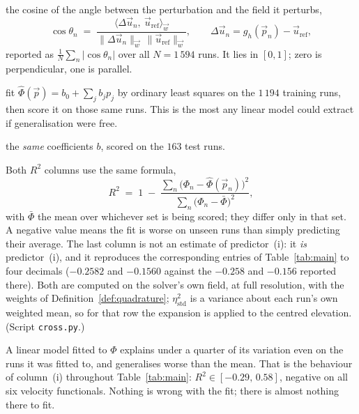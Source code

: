 \documentclass[11pt,a4paper]{article}
\theoremstyle{plain}
\theoremstyle{definition}
\theoremstyle{remark}
\begin{document}
\begin{description}\itemsep3pt
\item[mean $|\cos\theta|$] the cosine of the angle between the perturbation and
the field it perturbs,
\begin{equation}
\label{eq:costheta}
\cos\theta_n \;=\;
\frac{\bigl\langle \Delta\vec{u}_n,\ \vec{u}_{\mathrm{ref}}\bigr\rangle_{\vec w}}
     {\|\Delta\vec{u}_n\|_{\vec w}\ \|\vec{u}_{\mathrm{ref}}\|_{\vec w}},
\qquad
\Delta\vec{u}_n = g_h(\vec p_n) - \vec{u}_{\mathrm{ref}},
\end{equation}
reported as $\tfrac{1}{N}\sum_n |\cos\theta_n|$ over all $N = 1\,594$ runs.
It lies in $[0,1]$; zero is perpendicular, one is parallel.

\item[$R^2$ in sample] fit $\hat\Phi(\vec p) = b_0 + \sum_j b_j p_j$ by ordinary
least squares on the $1\,194$ training runs, then score it on those same runs.
This is the most any linear model could extract if generalisation were free.

\item[$R^2$ held out] the \emph{same} coefficients $b$, scored on the $163$ test
runs.
\end{description}

\noindent
Both $R^2$ columns use the same formula,
\begin{equation}
\label{eq:r2}
R^2 \;=\; 1 \;-\;
\frac{\sum_n \bigl(\Phi_n - \hat\Phi(\vec p_n)\bigr)^2}
     {\sum_n \bigl(\Phi_n - \bar\Phi\bigr)^2},
\end{equation}
with $\bar\Phi$ the mean over whichever set is being scored; they differ only in
that set. A negative value means the fit is worse on unseen runs than simply
predicting their average.
The last column is not an estimate of predictor~(i): it \emph{is} predictor~(i),
and it reproduces the corresponding entries of Table~\ref{tab:main} to four
decimals ($-0.2582$ and $-0.1560$ against the $-0.258$ and $-0.156$ reported
there). Both are computed on the solver's own field, at full resolution,
with the weights of Definition~\ref{def:quadrature}; $\eta_{\mathrm{std}}^2$ is a
variance about each run's own weighted mean, so for that row the expansion is
applied to the centred elevation.
\textnormal{(Script \texttt{cross.py}.)}

\label{cor:no-linear-signal}

A linear model fitted to $\Phi$ explains under a quarter of its variation even
on the runs it was fitted to, and generalises worse than the mean. That is the
behaviour of column~(i) throughout Table~\ref{tab:main}: $R^2 \in
[-0.29,\,0.58]$, negative on all six velocity functionals. Nothing is wrong with
the fit; there is almost nothing there to fit.
\end{document}

